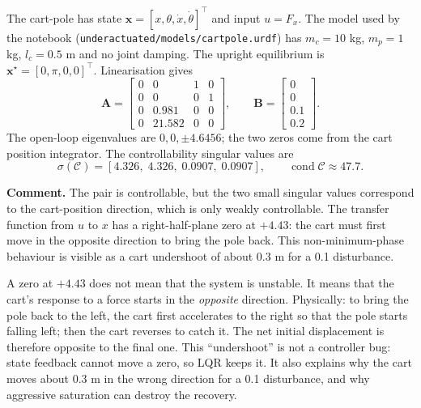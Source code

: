 \documentclass[11pt]{article}
\newcommand{\x}{\mathbf{x}}
\newcommand{\A}{\mathbf{A}}
\newcommand{\B}{\mathbf{B}}
\newcommand{\C}{\mathcal{C}}
\begin{document}
The cart-pole has state $\x=[x,\theta,\dot x,\dot\theta]^\top$ and input
$u=F_x$.  The model used by the notebook
(\texttt{underactuated/models/cartpole.urdf}) has $m_c=10$ kg, $m_p=1$ kg,
$l_c=0.5$ m and no joint damping.  The upright equilibrium is
$\x^\star=[0,\pi,0,0]^\top$.  Linearisation gives
\begin{equation}
\A=\begin{bmatrix}
0&0&1&0\\
0&0&0&1\\
0&0.981&0&0\\
0&21.582&0&0
\end{bmatrix},
\qquad
\B=\begin{bmatrix}0\\0\\0.1\\0.2\end{bmatrix}.
\end{equation}
The open-loop eigenvalues are $0,0,\pm4.6456$; the two zeros come from the cart
position integrator.  The controllability singular values are
\begin{equation}
\sigma(\C)=[4.326,\;4.326,\;0.0907,\;0.0907],
\qquad
\operatorname{cond}\C\approx47.7 .
\end{equation}

\textbf{Comment.}  The pair is controllable, but the two small singular values
correspond to the cart-position direction, which is only weakly controllable.
The transfer function from $u$ to $x$ has a right-half-plane zero at
$+4.43$: the cart must first move in the opposite direction to bring the pole
back.  This non-minimum-phase behaviour is visible as a cart undershoot of
about 0.3 m for a 0.1 disturbance.

\begin{pitfall}[title={What a right-half-plane zero really means}]
A zero at $+4.43$ does not mean that the system is unstable.  It means that
the cart's response to a force starts in the \emph{opposite} direction.
Physically: to bring the pole back to the left, the cart first accelerates to
the right so that the pole starts falling left; then the cart reverses to
catch it.  The net initial displacement is therefore opposite to the final
one.  This ``undershoot'' is not a controller bug: state feedback cannot move
a zero, so LQR keeps it.  It also explains why the cart moves about 0.3 m in
the wrong direction for a 0.1 disturbance, and why aggressive saturation can
destroy the recovery.
\end{pitfall}
\end{document}
